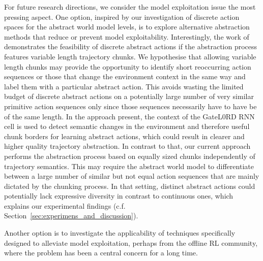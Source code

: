 \documentclass{article}
\begin{document}
For future research directions, we consider the model exploitation issue the most pressing aspect. One option, inspired by our investigation of discrete action spaces for the abstract world model levels, is to explore alternative abstraction methods that reduce or prevent model exploitability. Interestingly, the work of \citet{gumbsch2024learning} demonstrates the feasibility of discrete abstract actions if the abstraction process features variable length trajectory chunks. We hypothesise that allowing variable length chunks may provide the opportunity to identify short reoccurring action sequences or those that change the environment context in the same way and label them with a particular abstract action. This avoids wasting the limited budget of discrete abstract actions on a potentially large number of very similar primitive action sequences only since those sequences necessarily have to have be of the same length. In the approach \citet{gumbsch2024learning} present, the context of the GateL0RD RNN cell \citep{gumbsch2022sparsely} is used to detect semantic changes in the environment and therefore useful chunk borders for learning abstract actions, which could result in clearer and higher quality trajectory abstraction. In contrast to that, our current approach performs the abstraction process based on equally sized chunks independently of trajectory semantics. This may require the abstract world model to differentiate between a large number of similar but not equal action sequences that are mainly dictated by the chunking process. In that setting, distinct abstract actions could potentially lack expressive diversity in contrast to continuous ones, which explains our experimental findings (c.f. Section~\ref{sec:experimens_and_discussion}).

Another option is to investigate the applicability of techniques specifically designed to alleviate model exploitation, perhaps from the offline RL community, where the problem has been a central concern for a long time.


\end{document}
